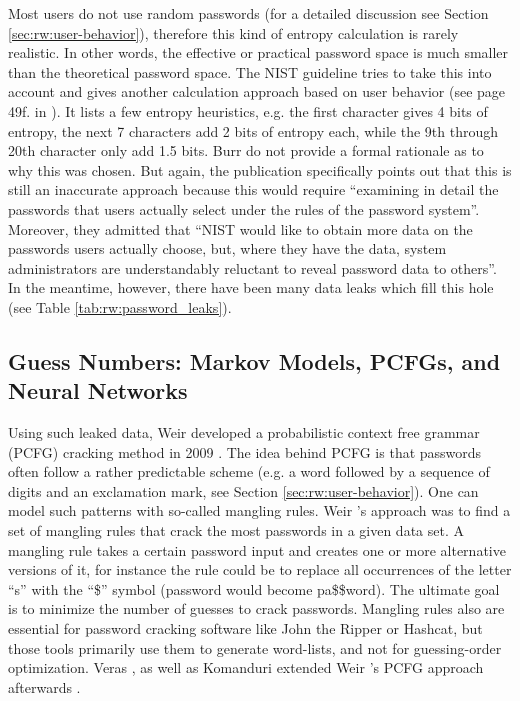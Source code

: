 	Most users do not use random passwords (for a detailed discussion see Section \ref{sec:rw:user-behavior}), therefore this kind of entropy calculation is rarely realistic. In other words, the effective or practical password space is much smaller than the theoretical password space. The NIST guideline tries to take this into account and gives another calculation approach based on user behavior (see page 49f. in \cite{Burr2004NISTEntropy}). It lists a few entropy heuristics, e.g. the first character gives 4 bits of entropy, the next 7 characters add 2 bits of entropy each, while the 9th through 20th character only add 1.5 bits. Burr \etal do not provide a formal rationale as to why this was chosen. But again, the publication specifically points out that this is still an inaccurate approach because this would require ``examining in detail the passwords that users actually select under the rules of the password system''. Moreover, they admitted that ``NIST would like to obtain more data on the passwords users actually choose, but, where	they have the data, system administrators are understandably reluctant to reveal password	data to others''. In the meantime, however, there have been many data leaks which fill this hole (see Table \ref{tab:rw:password_leaks}).
	
	\subsection{Guess Numbers: Markov Models, PCFGs, and Neural Networks}
	
	Using such leaked data, Weir \etal developed a probabilistic context free grammar (PCFG) cracking method in 2009 \cite{Weir2009PCFG}. The idea behind PCFG is that passwords often follow a rather predictable scheme (e.g. a word followed by a sequence of digits and an exclamation mark, see Section \ref{sec:rw:user-behavior}). One can model such patterns with so-called mangling rules. Weir \etal's approach was to find a set of mangling rules that crack the most passwords in a given data set. A mangling rule takes a certain password input and creates one or more alternative versions of it, for instance the rule could be to replace all occurrences of the letter ``s'' with the ``\$'' symbol (password would become pa\$\$word). The ultimate goal is to minimize the number of guesses to crack passwords. Mangling rules also are essential for password cracking software like John the Ripper or Hashcat, but those tools primarily use them to generate word-lists, and not for guessing-order optimization. Veras \etal \cite{Veras2014SemanticPatterns}, as well as Komanduri extended Weir \etal's PCFG approach afterwards \cite{Komanduri2016Dissertation}.

